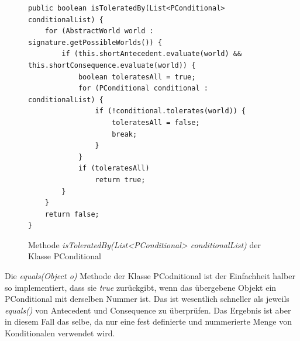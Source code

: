 \documentclass[12pt,a4paper]{article}
\begin{document}
\begin{figure}
\begin{lstlisting}
public boolean isToleratedBy(List<PConditional> conditionalList) {
    for (AbstractWorld world : signature.getPossibleWorlds()) {
        if (this.shortAntecedent.evaluate(world) && this.shortConsequence.evaluate(world)) {
            boolean toleratesAll = true;
            for (PConditional conditional : conditionalList) {
                if (!conditional.tolerates(world)) {
                    toleratesAll = false;
                    break;
                }
            }
            if (toleratesAll)
                return true;
        }
    }
    return false;
}
\end{lstlisting}
\caption{Methode \textit{isToleratedBy(List<PConditional> conditionalList)} der Klasse PConditional}
\label{code:conditional-istoleratedby}
\end{figure}




Die \textit{equals(Object o)} Methode der Klasse PCodnitional ist der Einfachheit halber so implementiert, dass sie \textit{true} zurückgibt, wenn das übergebene Objekt ein PConditional mit derselben Nummer ist. Das ist wesentlich schneller als jeweils \textit{equals()} von Antecedent und Consequence zu überprüfen. Das Ergebnis ist aber in diesem Fall das selbe, da nur eine fest definierte und nummerierte Menge von Konditionalen verwendet wird.
\end{document}
